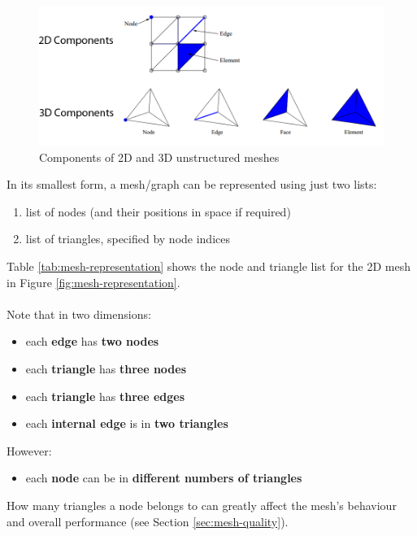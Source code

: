 \documentclass{article}
\begin{document}
\begin{figure}
	\centering
	\includegraphics[scale=0.4]{figures/unstructured-mesh-components.png}
	\caption{Components of 2D and 3D unstructured meshes}
	\label{fig:mesh-components}
\end{figure}

In its smallest form, a mesh/graph can be represented using just two lists:
\begin{enumerate}
	\item list of nodes (and their positions in space if required)
	\item list of triangles, specified by node indices
\end{enumerate}

Table \ref{tab:mesh-representation} shows the node and triangle list for the 2D mesh in Figure \ref{fig:mesh-representation}.

\paragraph{}

Note that in two dimensions:
\begin{itemize}
	\item each \textbf{edge} has \textbf{two nodes}
	\item each \textbf{triangle} has \textbf{three nodes}
	\item each \textbf{triangle} has \textbf{three edges}
	\item each \textbf{internal edge} is in \textbf{two triangles}
\end{itemize}
However:
\begin{itemize}
	\item each \textbf{node} can be in \textbf{different numbers of triangles}
\end{itemize}
How many triangles a node belongs to can greatly affect the mesh's behaviour and overall performance (see Section \ref{sec:mesh-quality}).
\end{document}
